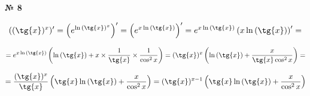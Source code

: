 \documentclass{article}
\begin{document}
\textbf{№ 8} 

\begingroup
\Large

$$ ((\tg{x})^{x})'
= \left( e^{\ln{(\tg{x})^{x}}} \right)'
= \left( e^{x \ln{(\tg{x})}} \right)'
= e^{x \ln{(\tg{x})}} \left( x \ln{(\tg{x})} \right)'
= $$

$$ = e^{x \ln{(\tg{x})}} \left( \ln{(\tg{x})} + x \times \frac{1}{\tg{x}} \times \frac{1}{\cos^2{x}} \right)
= (\tg{x})^{x} \left( \ln{(\tg{x})} + \frac{x}{\tg{x} \cos^2{x}}\right)
= $$

$$ = \frac{(\tg{x})^{x}}{\tg{x}} \left( \tg{x}\ln{(\tg{x})} + \frac{x}{\cos^2{x}}\right)
= (\tg{x})^{x-1} \left( \tg{x}\ln{(\tg{x})} + \frac{x}{\cos^2{x}}\right)$$

\endgroup
\end{document}
